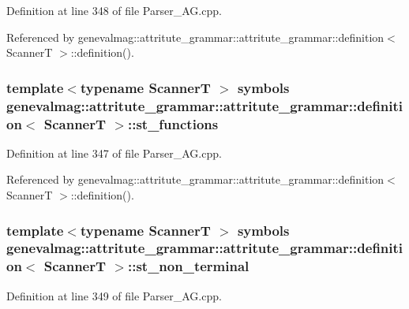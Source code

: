 Definition at line 348 of file Parser\_\-AG.cpp.

Referenced by genevalmag::attritute\_\-grammar::attritute\_\-grammar::definition$<$ ScannerT $>$::definition().\hypertarget{structgenevalmag_1_1attritute__grammar_1_1definition_cc7df5d09ef5238785ace5908c499b5f}{
\subsubsection[{st\_\-functions}]{\setlength{\rightskip}{0pt plus 5cm}template$<$typename ScannerT $>$ symbols genevalmag::attritute\_\-grammar::attritute\_\-grammar::definition$<$ ScannerT $>$::{\bf st\_\-functions}}}
\label{structgenevalmag_1_1attritute__grammar_1_1definition_cc7df5d09ef5238785ace5908c499b5f}




Definition at line 347 of file Parser\_\-AG.cpp.

Referenced by genevalmag::attritute\_\-grammar::attritute\_\-grammar::definition$<$ ScannerT $>$::definition().\hypertarget{structgenevalmag_1_1attritute__grammar_1_1definition_0a13c3f4bfa8be61df721104f254109e}{
\subsubsection[{st\_\-non\_\-terminal}]{\setlength{\rightskip}{0pt plus 5cm}template$<$typename ScannerT $>$ symbols genevalmag::attritute\_\-grammar::attritute\_\-grammar::definition$<$ ScannerT $>$::{\bf st\_\-non\_\-terminal}}}
\label{structgenevalmag_1_1attritute__grammar_1_1definition_0a13c3f4bfa8be61df721104f254109e}




Definition at line 349 of file Parser\_\-AG.cpp.

